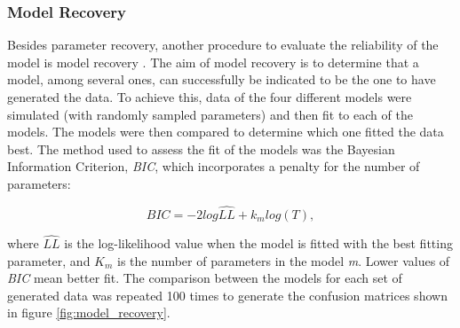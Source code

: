 \documentclass[a4paper,12pt]{article}
\begin{document}
\subsubsection{Model Recovery}
Besides parameter recovery, another procedure to evaluate the reliability of the model is model recovery \citep{Wilson2019a}. The aim of model recovery is to determine that a model, among several ones, can successfully be indicated to be the one to have generated the data. To achieve this, data of the four different models were simulated (with randomly sampled parameters) and then fit to each of the models. The models were then compared to determine which one fitted the data best. The method used to assess the fit of the models was the Bayesian Information Criterion, \textit{BIC}, which incorporates a penalty for the number of parameters:

\begin{equation}
BIC = {-2}log \hat{LL} + k_m log{(T)},
\label{eq:BIC}
\end{equation}

\noindent
where $\hat{LL}$ is the log-likelihood value when the model is fitted with the best fitting parameter, and $K_m$ is the number of parameters in the model \textit{m}. Lower values of \textit{BIC} mean better fit. The comparison between the models for each set of generated data was repeated 100 times to generate the confusion matrices shown in figure \ref{fig:model_recovery}.



\end{document}
